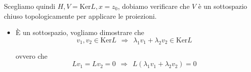 \begin{dimostrazione}
\begin{itemize}
\begin{figure}[H]

              \end{figure}
              \FloatBarrier


              Scegliamo quindi $H,V=\mathrm{Ker} L,x=z_{0}$, dobiamo verificare che $V$ è un sottospazio chiuso topologicamente per applicare le proiezioni.
              \begin{itemize}
                  \item È un sottospazio, vogliamo dimostrare che
                        \begin{equation*}
                            v_{1},v_{2} \in \mathrm{Ker} L\ \ \Rightarrow \ \ \lambda _{1} v_{1} +\lambda _{2} v_{2} \in \mathrm{Ker} L
                        \end{equation*}

                        ovvero che
                        \begin{equation*}
                            Lv_{1} =Lv_{2} =0\ \ \Rightarrow \ \ L(\lambda _{1} v_{1} +\lambda _{2} v_{2}) =0
                        \end{equation*}


\end{itemize}
\end{itemize}
\end{dimostrazione}
